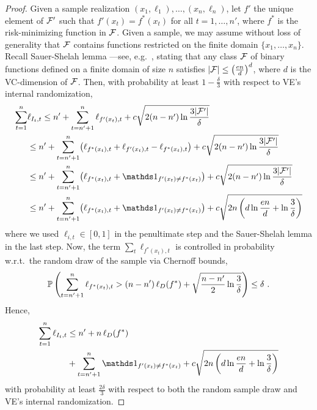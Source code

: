 \begin{proof}
Given a sample realization $(x_1,\ell_1),\dots,(x_n,\ell_n)$, let $f'$ the unique element of $\cF'$ such that $f'(x_t) = f^*(x_t)$ for all $t=1,\dots,n'$, where $f^*$ is the risk-minimizing function in $\cF$. Given a sample, we may assume without loss of generality that $\cF$ contains functions restricted on the finite domain $\{x_1,\dots,x_n\}$. Recall Sauer-Shelah lemma ---see, e.g.~\cite{BBL05}, stating that any class $\cF$ of binary functions defined on a finite domain of size $n$ satisfies $|\cF| \le \left(\frac{en}{d}\right)^d$, where $d$ is the VC-dimension of $\cF$. 
Then, with probability at least $1- \tfrac{\delta}{3}$ with respect to VE's internal randomization,
\begin{align*}
    \sum_{t=1}^n &\ell_{I_t,t}
\le
    n' + \sum_{t=n'+1}^n \ell_{f'(x_t),t} + c\sqrt{2(n-n')\ln\frac{3|\cF'|}{\delta}}
\\ &\le
    n' + \sum_{t=n'+1}^n \bigl( \ell_{f^*(x_t),t} + \ell_{f'(x_t),t} - \ell_{f^*(x_t),t}\bigr) + c\sqrt{2(n-n')\ln\frac{3|\cF'|}{\delta}}
\\ &\le
    n' + \sum_{t=n'+1}^n \bigl( \ell_{f^*(x_t),t} + \ds1_{f'(x_t) \neq f^*(x_t)} \bigr) + c\sqrt{2(n-n')\ln\frac{3|\cF'|}{\delta}}
\\ &\le
    n' + \sum_{t=n'+1}^n \bigl( \ell_{f^*(x_t),t} + \ds1_{f'(x_t) \neq f^*(x_t)} \bigr) + c\sqrt{2n\left(d\ln\frac{en}{d}+ \ln\frac{3}{\delta}\right)}
\end{align*}
where we used $\ell_{i,t}\in [0,1]$ in the penultimate step and the Sauer-Shelah lemma in the last step.
Now, the term $\sum_t \ell_{f^*(x_t),t}$ is controlled in probability w.r.t.\ the random draw of the sample via Chernoff bounds,
\[
    \P\left(\sum_{t=n'+1}^n \ell_{f^*(x_t),t} > (n-n')\,\ell_D(f^*) + \sqrt{\frac{n-n'}{2}\ln\frac{3}{\delta}} \right) \le \delta~.
\]
Hence,
\begin{align*}
    \sum_{t=1}^n \ell_{I_t,t}
&\le
    n' + n\,\ell_D(f^*)
\\ &+ \sum_{t=n'+1}^n \ds1_{f'(x_t) \neq f^*(x_t)} + c\sqrt{2n\left(d\ln\frac{en}{d}+ \ln\frac{3}{\delta}\right)}
\end{align*}
with probability at least $\tfrac{2\delta}{3}$ with respect to both the random sample draw and VE's internal randomization.


\end{proof}
